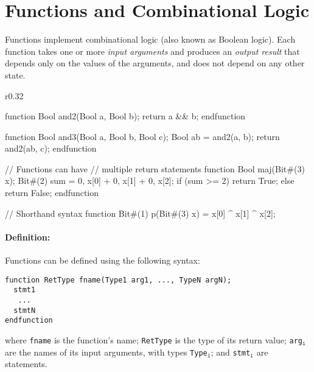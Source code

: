 \section{Functions and Combinational Logic}
\label{sec:functions}

Functions implement combinational logic (also known as Boolean logic).
Each function takes one or more \emph{input arguments} and produces an
\emph{output result} that depends only on the values of the arguments,
and does not depend on any other state.

\begin{wrapfigure}{r}{0.32\columnwidth}
\vspace{-1em}
\begin{mscode}
function Bool and2(Bool a,
                   Bool b);
  return a && b;
endfunction

function Bool and3(Bool a,
                   Bool b,
                   Bool c);
  Bool ab = and2(a, b);
  return and2(ab, c);
endfunction

// Functions can have 
// multiple return statements
function Bool maj(Bit#(3) x);
  Bit#(2) sum = {0, x[0]} +
                {0, x[1]} +
                {0, x[2]};
  if (sum >= 2) return True;
  else return False;
endfunction

// Shorthand syntax
function Bit#(1) p(Bit#(3) x)
  = x[0] ^ x[1] ^ x[2];
\end{mscode}
\vspace{-6em}
\end{wrapfigure}


\paragraph{Definition:}
Functions can be defined using the following syntax:
\begin{center}
\verb|function RetType fname(Type1 arg1, ..., TypeN argN);| \\
\verb|  stmt1                                             | \\
\verb|   ...                                              | \\
\verb|  stmtN                                             | \\
\verb|endfunction                                         |
\end{center}
where \verb|fname| is the function's name;
\verb|RetType| is the type of its return value;
\verb|arg|$_{\texttt{i}}$ are the names of its input arguments,
with types \verb|Type|$_{\texttt{i}}$;
and \verb|stmt|$_{\texttt{i}}$ are statements.


